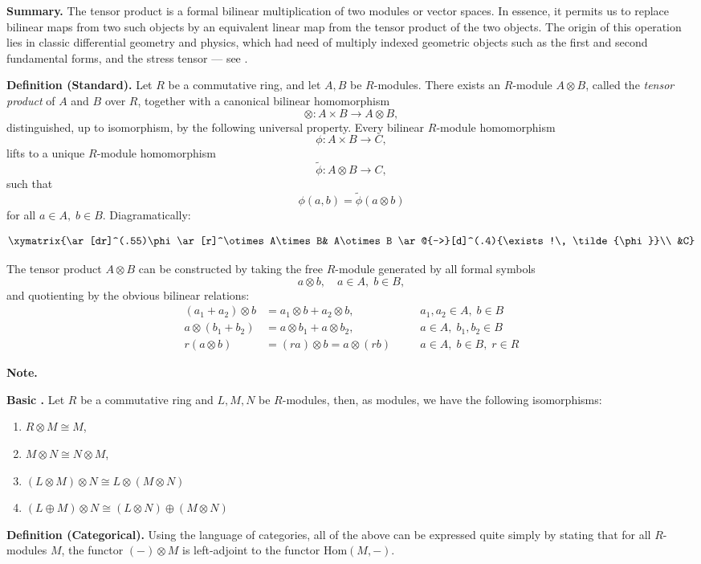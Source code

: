 \documentclass[12pt]{article}
\begin{document}
{\bf Summary.}  The tensor product is a formal bilinear multiplication
of two modules or vector spaces.  In essence, it permits us to replace
bilinear maps from two such objects by an equivalent linear map from
the tensor product of the two objects.  The origin of this operation
lies in classic differential geometry and physics, which had need of
multiply indexed geometric objects such as the first and second
fundamental forms, and the stress tensor --- see .

{\bf Definition (Standard).} Let $R$ be a commutative ring, and let $A,
B$ be $R$-modules. There exists an $R$-module $A\otimes B$, called the
\emph{tensor product} of $A$ and $B$ over $R$, together with a canonical
bilinear homomorphism
$$\otimes: A\times B\rightarrow A\otimes B,$$
distinguished, up to isomorphism, by the following universal
property.
Every bilinear $R$-module homomorphism
$$\phi: A\times B\rightarrow C,$$
lifts to a unique $R$-module homomorphism
$$\tilde{\phi}: A\otimes B\rightarrow C,$$
such that
$$\phi(a,b) = \tilde{\phi}(a\otimes b)$$
for all $a\in A,\; b\in B.$  Diagramatically:

$$
\xymatrix{\ar[dr]^(.55)\phi \ar[r]^\otimes A\times B& A\otimes B
  \ar@{-->}[d]^(.4){\exists !\, \tilde{\phi}}\\  &C}
$$

The tensor product $A\otimes B$ can be constructed by taking the free
$R$-module generated by all formal symbols 
$$a\otimes b,\quad a\in A,\;b\in B,$$
and quotienting by the obvious bilinear relations:
\begin{align*}
  (a_1+a_2)\otimes b &= a_1\otimes b + a_2\otimes b,\quad &&a_1,a_2\in
  A,\; b\in B \\
  a\otimes(b_1+b_2) &= a\otimes b_1 +  a\otimes b_2,\quad &&a\in A,\;b_1,b_2\in
  B \\
  r(a\otimes b) &= (ra)\otimes b= a\otimes (rb)\quad &&a\in A,\;b\in
  B,\; r\in R  
\end{align*}

{\bf Note.} 

{\bf Basic .} Let $R$ be a commutative ring and $L,M,N$ be $R$-modules, then, as modules, we have the following isomorphisms:
\begin{enumerate}
\item $R\otimes M\cong M$,
\item $M\otimes N\cong N\otimes M$,
\item $(L\otimes M) \otimes N\cong L\otimes (M\otimes N)$
\item $(L\oplus M)\otimes N \cong (L\otimes N) \oplus (M\otimes N)$
\end{enumerate}

{\bf Definition (Categorical).} Using the language of categories, all
of the above can be expressed quite simply by stating that for all
$R$-modules $M$, the functor $ (-) \otimes M$ is left-adjoint to the
functor $\mathrm{Hom}(M,-)$.
\end{document}
